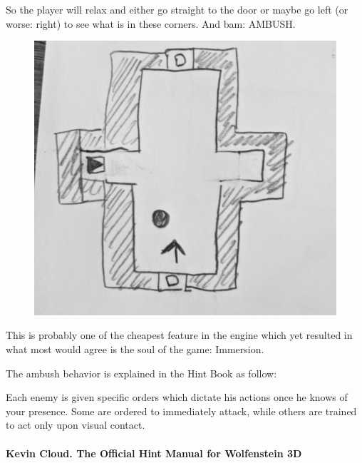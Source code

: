 \begin{minipage}{.6\textwidth}
So the player will relax and either go straight to the door or maybe go left (or worse: right) to see what is in these corners. And bam: AMBUSH.
\end{minipage}
\begin{minipage}{.35\textwidth}
\hfill
\begin{figure}[H]
 \includegraphics[width=\textwidth]{imgs/ambush/map_ambushed_drawing.png}
\end{figure}
\end{minipage}

\par
This is probably one of the cheapest feature in the engine which yet resulted in what most would agree is the soul of the game: Immersion.\\
\par

 The ambush behavior is explained in the Hint Book as follow:\\
\par
\begin{fancyquotes}
Each enemy is given specific orders which dictate his actions once he knows of your presence. Some are ordered to immediately attack, while others are trained to act only upon visual contact.
 \bigskip \\
\bigskip \\
\textbf{Kevin Cloud. The Official Hint Manual for Wolfenstein 3D}
 \end{fancyquotes}

